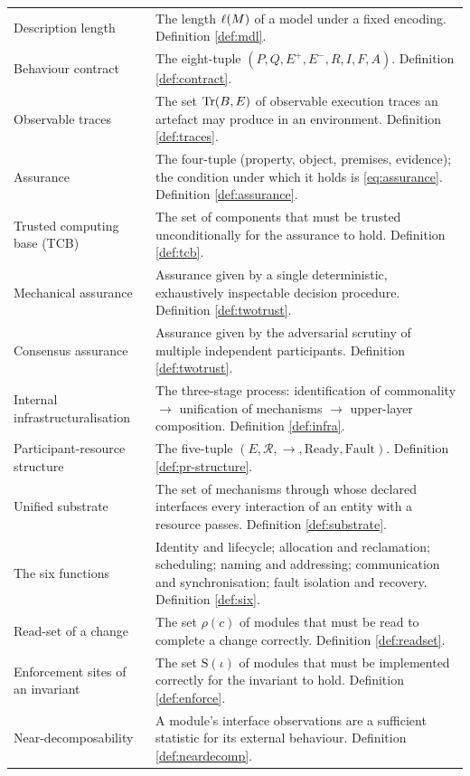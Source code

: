\begin{longtable}{L{3.4cm}L{11.0cm}}
Description length & The length $\ell(M)$ of a model under a fixed encoding. Definition
  \ref{def:mdl}. \\
Behaviour contract & The eight-tuple $(P, Q, E^{+}, E^{-}, R, I, F, A)$. Definition
  \ref{def:contract}. \\
Observable traces & The set $\operatorname{Tr}(B,E)$ of observable execution traces an artefact may
  produce in an environment. Definition \ref{def:traces}. \\
Assurance & The four-tuple (property, object, premises, evidence); the condition under
  which it holds is \eqref{eq:assurance}. Definition \ref{def:assurance}. \\
Trusted computing base (TCB) & The set of components that must be trusted unconditionally
  for the assurance to hold. Definition \ref{def:tcb}. \\
Mechanical assurance & Assurance given by a single deterministic, exhaustively inspectable
  decision procedure. Definition \ref{def:twotrust}. \\
Consensus assurance & Assurance given by the adversarial scrutiny of multiple independent
  participants. Definition \ref{def:twotrust}. \\
Internal infrastructuralisation & The three-stage process: identification of commonality
  $\to$ unification of mechanisms $\to$ upper-layer composition. Definition
  \ref{def:infra}. \\
Participant-resource structure & The five-tuple
  $(E, \mathcal{R}, \to, \mathrm{Ready}, \mathrm{Fault})$. Definition
  \ref{def:pr-structure}. \\
Unified substrate & The set of mechanisms through whose declared interfaces every
  interaction of an entity with a resource passes. Definition \ref{def:substrate}. \\
The six functions & Identity and lifecycle; allocation and reclamation; scheduling; naming
  and addressing; communication and synchronisation; fault isolation and recovery.
  Definition \ref{def:six}. \\
Read-set of a change & The set $\rho(c)$ of modules that must be read to complete a change
  correctly. Definition \ref{def:readset}. \\
Enforcement sites of an invariant & The set $\mathrm{S}(\iota)$ of modules that must be
  implemented correctly for the invariant to hold. Definition \ref{def:enforce}. \\
Near-decomposability & A module's interface observations are a sufficient statistic for
  its external behaviour. Definition \ref{def:neardecomp}. \\

\end{longtable}
